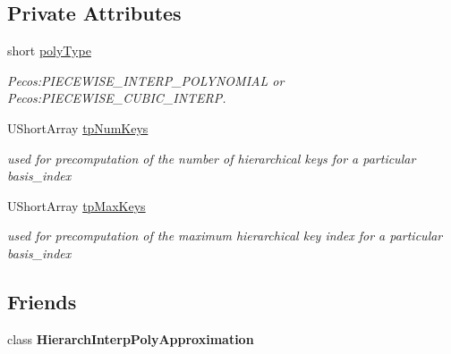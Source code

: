 \subsection*{Private Attributes}
\begin{DoxyCompactItemize}
\item 
short \hyperlink{classPecos_1_1SharedHierarchInterpPolyApproxData_a970543a457eb553062de2c843797782a}{poly\+Type}\label{classPecos_1_1SharedHierarchInterpPolyApproxData_a970543a457eb553062de2c843797782a}

\begin{DoxyCompactList}\small\item\em Pecos\+:P\+I\+E\+C\+E\+W\+I\+S\+E\+\_\+\+I\+N\+T\+E\+R\+P\+\_\+\+P\+O\+L\+Y\+N\+O\+M\+I\+AL or Pecos\+:P\+I\+E\+C\+E\+W\+I\+S\+E\+\_\+\+C\+U\+B\+I\+C\+\_\+\+I\+N\+T\+E\+RP. \end{DoxyCompactList}\item 
U\+Short\+Array \hyperlink{classPecos_1_1SharedHierarchInterpPolyApproxData_a2e6968bcff43acd4252c1f606c1e34ee}{tp\+Num\+Keys}\label{classPecos_1_1SharedHierarchInterpPolyApproxData_a2e6968bcff43acd4252c1f606c1e34ee}

\begin{DoxyCompactList}\small\item\em used for precomputation of the number of hierarchical keys for a particular basis\+\_\+index \end{DoxyCompactList}\item 
U\+Short\+Array \hyperlink{classPecos_1_1SharedHierarchInterpPolyApproxData_a5aed04bc32bdc6e7e0dc99530cfcfb1b}{tp\+Max\+Keys}\label{classPecos_1_1SharedHierarchInterpPolyApproxData_a5aed04bc32bdc6e7e0dc99530cfcfb1b}

\begin{DoxyCompactList}\small\item\em used for precomputation of the maximum hierarchical key index for a particular basis\+\_\+index \end{DoxyCompactList}\end{DoxyCompactItemize}
\subsection*{Friends}
\begin{DoxyCompactItemize}
\item 
class {\bfseries Hierarch\+Interp\+Poly\+Approximation}\label{classPecos_1_1SharedHierarchInterpPolyApproxData_ac5be928f91f05e9db6cfd416fb6abdb4}

\end{DoxyCompactItemize}
